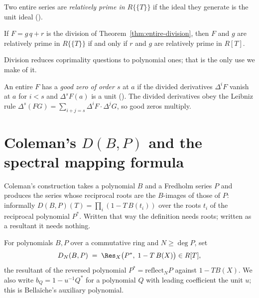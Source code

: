 \begin{definition}
  \label{def:isentirecoprime}
  \leanok
  Two entire series are \emph{relatively prime in $R\{\{T\}\}$} if the ideal they generate is
  the unit ideal (\cite[Definition 2.2.1]{JN}).
\end{definition}

\begin{lemma}
  \label{lem:coprime-remainder}
  \leanok
  If $F = g\,q + r$ is the division of Theorem~\ref{thm:entire-division}, then $F$ and $g$ are
  relatively prime in $R\{\{T\}\}$ if and only if $r$ and $g$ are relatively prime in $R[T]$.
\end{lemma}

Division reduces coprimality questions to polynomial ones; that is the only use we make of it.

\begin{definition}
  \label{def:isgoodzero}
  \leanok
  An entire $F$ has a \emph{good zero of order $s$} at $a$ if the divided derivatives
  $\Delta^{i}F$ vanish at $a$ for $i < s$ and $\Delta^{s}F(a)$ is a unit
  (\cite[Definition II.2.11]{Bellaiche}).  The divided derivatives obey the Leibniz rule
  $\Delta^{s}(FG) = \sum_{i+j=s}\Delta^{i}F\cdot\Delta^{j}G$, so good zeros multiply.
\end{definition}

\section{Coleman's $D(B,P)$ and the spectral mapping formula}

Coleman's construction \cite[\S A3--A4]{Coleman} takes a polynomial $B$ and a Fredholm series
$P$ and produces the series whose reciprocal roots are the $B$-images of those of $P$:
informally $D(B,P)(T) = \prod_i (1 - T\,B(t_i))$ over the roots $t_i$ of the reciprocal
polynomial $P^{*}$.  Written that way the definition needs roots; written as a resultant it
needs nothing.

\begin{definition}
  \label{def:dpoly}
  \leanok
  For polynomials $B, P$ over a commutative ring and $N \geq \deg P$, set
  \[
    D_N(B,P) \;=\; \Res_X\bigl(P^{*}, \; 1 - T\,B(X)\bigr) \in R[T],
  \]
  the resultant of the reversed polynomial $P^{*} = \mathrm{reflect}_N P$ against
  $1 - T B(X)$.  We also write $b_Q = 1 - u^{-1}Q^{*}$ for a polynomial $Q$ with leading
  coefficient the unit $u$; this is Bella\"iche's auxiliary polynomial.
\end{definition}

